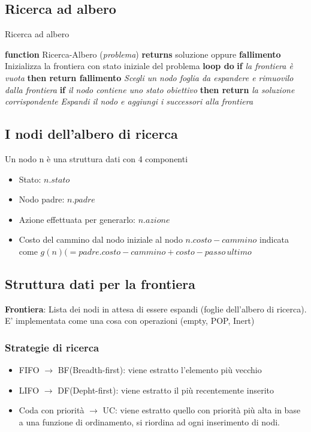 \documentclass{article}
\begin{document}
\subsection{Ricerca ad albero}
\begin{algorithm}
\caption{Ricerca ad albero}
\begin{center}
    \textbf{function} Ricerca-Albero (\textit{problema})\newline
    \textbf{returns} soluzione oppure \textbf{fallimento}\newline
    Inizializza la frontiera con stato iniziale del problema\newline
    \textbf{loop do}\newline
    \textbf{if} \textit{la frontiera è vuota} \textbf{then return fallimento}\newline
    \textit{Scegli un nodo foglia da espandere e rimuovilo dalla frontiera}\newline
    \textbf{if} \textit{il nodo contiene uno stato obiettivo}\newline
    \textbf{then return} \textit{la soluzione corrispondente}\newline
    \textit{Espandi il nodo e aggiungi i successori alla frontiera}
    
\end{center}
\end{algorithm}
\subsection{I nodi dell'albero di ricerca}
Un nodo n è una struttura dati con 4 componenti
\begin{itemize}
    \item Stato: $n.stato$
    \item Nodo padre: $n.padre$
    \item Azione effettuata per generarlo: $n.azione$
    \item Costo del cammino dal nodo iniziale al nodo $n.costo-cammino$ indicata come $g(n) (=padre.costo-cammino+costo-passo\,ultimo$
\end{itemize}
\subsection{Struttura dati per la frontiera}
\textbf{Frontiera}: Lista dei nodi in attesa di essere espandi (foglie dell'albero di ricerca). E' implementata come una cosa con operazioni (empty, POP, Inert)
\subsubsection{Strategie di ricerca}
\begin{itemize}
    \item FIFO $\rightarrow$ BF(Breadth-first): viene estratto l'elemento più vecchio
    \item LIFO $\rightarrow$ DF(Depht-first): viene estratto il più recentemente inserito
    \item Coda con priorità $\rightarrow$ UC: viene estratto quello con priorità più alta in base a una funzione di ordinamento, si riordina ad ogni inserimento di nodi.
\end{itemize}
\end{document}
